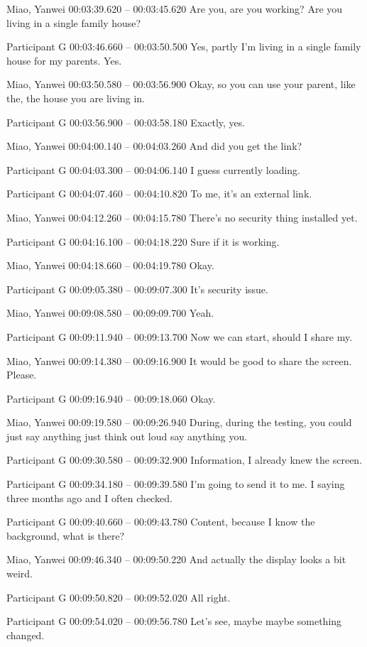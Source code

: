 {Miao, Yanwei 00:03:39.620 -- 00:03:45.620
Are you, are you working? Are you living in a single family house?

Participant G 00:03:46.660 -- 00:03:50.500
Yes, partly I'm living in a single family house for my parents. Yes.

Miao, Yanwei 00:03:50.580 -- 00:03:56.900
Okay, so you can use your parent, like the, the house you are living in.

Participant G 00:03:56.900 -- 00:03:58.180
Exactly, yes.

Miao, Yanwei 00:04:00.140 -- 00:04:03.260
And did you get the link?

Participant G 00:04:03.300 -- 00:04:06.140
I guess currently loading.

Participant G 00:04:07.460 -- 00:04:10.820
To me, it's an external link.

Miao, Yanwei 00:04:12.260 -- 00:04:15.780
There's no security thing installed yet.

Participant G 00:04:16.100 -- 00:04:18.220
Sure if it is working.

Miao, Yanwei 00:04:18.660 -- 00:04:19.780
Okay.

Participant G 00:09:05.380 -- 00:09:07.300
It's security issue.

Miao, Yanwei 00:09:08.580 -- 00:09:09.700
Yeah.

Participant G 00:09:11.940 -- 00:09:13.700
Now we can start, should I share my.

Miao, Yanwei 00:09:14.380 -- 00:09:16.900
It would be good to share the screen. Please.

Participant G 00:09:16.940 -- 00:09:18.060
Okay.

Miao, Yanwei 00:09:19.580 -- 00:09:26.940
During, during the testing, you could just say anything just think out loud say anything you.

Participant G 00:09:30.580 -- 00:09:32.900
Information, I already knew the screen.

Participant G 00:09:34.180 -- 00:09:39.580
I'm going to send it to me. I saying three months ago and I often checked.

Participant G 00:09:40.660 -- 00:09:43.780
Content, because I know the background, what is there?

Miao, Yanwei 00:09:46.340 -- 00:09:50.220
And actually the display looks a bit weird.

Participant G 00:09:50.820 -- 00:09:52.020
All right.

Participant G 00:09:54.020 -- 00:09:56.780
Let's see, maybe maybe something changed.

}
